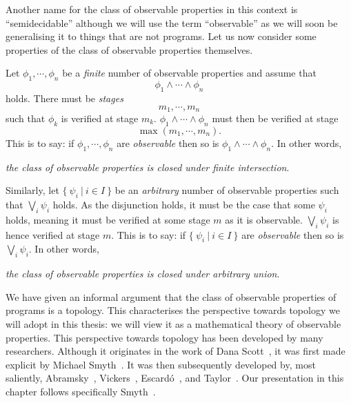 Another name for the class of observable properties in this context is ``semidecidable''
although we will use the term ``observable'' as we will soon be generalising it to things
that are not programs. Let us now consider some properties of the class of observable
properties themselves.

Let $\phi_1, \cdots ,\phi_n$ be a \emph{finite} number of observable properties and assume that
\begin{equation*}
  \phi_1 \wedge \cdots \wedge \phi_n
\end{equation*}
holds. There must be \emph{stages}
\begin{equation*}
  m_1, \cdots , m_n
\end{equation*}
such that $\phi_k$ is verified at stage $m_k$. $\phi_1 \wedge \cdots \wedge \phi_n$ must then be verified at stage
\begin{equation*}
  \max(m_1, \cdots, m_n).
\end{equation*}
This is to say: if $\phi_1, \cdots, \phi_n$ are \emph{observable} then so is
$\phi_1 \wedge \cdots \wedge \phi_n$. In other words,
\begin{center}
  \emph{the class of observable properties is closed under finite intersection}.
\end{center}

Similarly, let $\{~\psi_i ~|~ i \in I~\}$ be an \emph{arbitrary} number of observable
properties such that $\bigvee_i \psi_i$ holds. As the disjunction holds, it must be the case that
some $\psi_i$ holds, meaning it must be verified at some stage $m$ as it is observable. $\bigvee_i
\psi_i$ is hence verified at stage $m$. This is to say: if $\{~\psi_i ~|~ i \in I~\}$ are
\emph{observable} then so is $\bigvee_i \psi_i$. In other words,
\begin{center}
  \emph{the class of observable properties is closed under arbitrary union}.
\end{center}

We have given an informal argument that the class of observable properties of programs is
a topology. This characterises the perspective towards topology we will adopt in this
thesis: we will view it as a mathematical theory of observable properties. This
perspective towards topology has been developed by many researchers. Although it
originates in the work of Dana Scott~\cite{scott-original}, it was first made explicit by
Michael Smyth~\cite{smyth-handbook}. It was then subsequently developed by,
most saliently,
  Abramsky~\cite{abramsky-thesis},
  Vickers~\cite{vickers},
  Escardó~\cite{synthetic-topology}, and
  Taylor~\cite{taylor-asd}.
Our presentation in this chapter follows specifically Smyth~\cite{smyth-handbook}.

